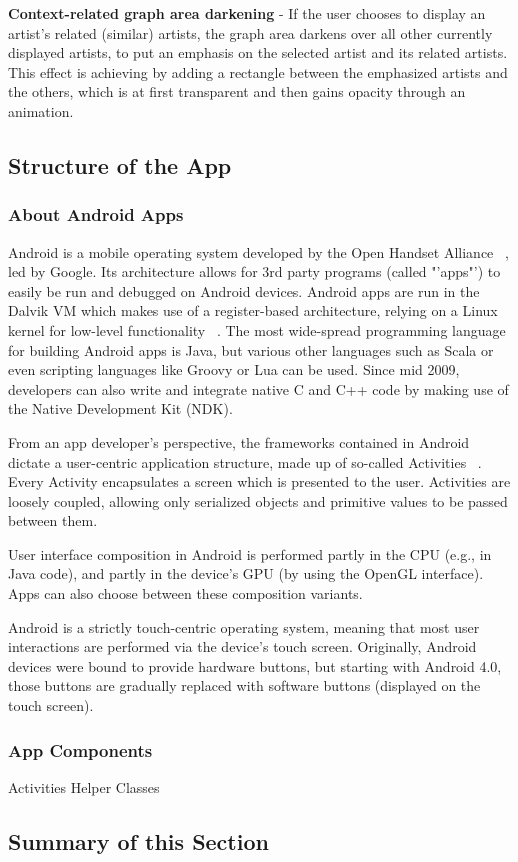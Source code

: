 \textbf{Context-related graph area darkening} - If the user chooses to display an artist's related (similar) artists, the graph area darkens over all other currently displayed artists, to put an emphasis on the selected artist and its related artists. This effect is achieving by adding a rectangle between the emphasized artists and the others, which is at first transparent and then gains opacity through an animation.

\subsection{Structure of the App}

\subsubsection{About Android Apps}

Android is a mobile operating system developed by the Open Handset Alliance ~\cite{url:openhandsetalliance}, led by Google. Its architecture allows for 3rd party programs (called "'apps"') to easily be run and debugged on Android devices.
Android apps are run in the Dalvik VM which makes use of a register-based architecture, relying on a Linux kernel for low-level functionality ~\cite{dalvik}. The most wide-spread programming language for building Android apps is Java, but various other languages such as Scala or even scripting languages like Groovy or Lua can be used. Since mid 2009, developers can also write and integrate native C and C++ code by making use of the Native Development Kit (NDK).

From an app developer's perspective, the frameworks contained in Android dictate a user-centric application structure, made up of so-called Activities ~\cite{url:androidactivity}. Every Activity encapsulates a screen which is presented to the user. Activities are loosely coupled, allowing only serialized objects and primitive values to be passed between them.

User interface composition in Android is performed partly in the CPU (e.g., in Java code), and partly in the device's GPU (by using the OpenGL interface). Apps can also choose between these composition variants.

Android is a strictly touch-centric operating system, meaning that most user interactions are performed via the device's touch screen. Originally, Android devices were bound to provide hardware buttons, but starting with Android 4.0, those buttons are gradually replaced with software buttons (displayed on the touch screen).

\subsubsection{App Components}

Activities
Helper Classes

\subsection{Summary of this Section}